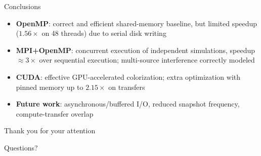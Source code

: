 \documentclass[11pt,aspectratio=169]{beamer}
\begin{document}
\begin{frame}{Conclusions}
  \begin{itemize}
    \item \textbf{OpenMP}: correct and efficient shared-memory
      baseline, but limited speedup ($1.56\times$ on 48 threads)
      due to serial disk writing
    \item \textbf{MPI+OpenMP}: concurrent execution of independent
      simulations, speedup $\approx 3\times$ over sequential
      execution; multi-source interference correctly modeled
    \item \textbf{CUDA}: effective GPU-accelerated colorization; extra
      optimization with pinned memory up to $2.15\times$ on transfers
    \item \textbf{Future work}: asynchronous/buffered I/O, reduced
      snapshot frequency, compute-transfer overlap
  \end{itemize}
\end{frame}

\begin{frame}
  \centering
  \Huge Thank you for your attention
  \vspace{0.5cm}

  \large Questions?
\end{frame}
\end{document}

